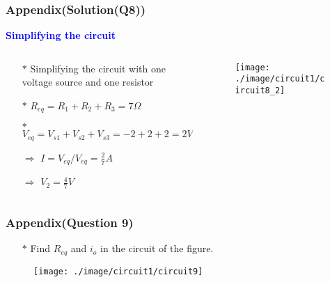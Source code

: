 \documentclass{beamer}
\newcommand{\blue}[1]{\textcolor{blue}{#1}}
\begin{document}
\begin{frame}
\frametitle{Appendix(Solution(Q8))}
\blue{{\bf Simplifying the circuit}}

\begin{columns}
\begin{column}{7cm}
\begin{itemize} \itemsep1pt \parskip0pt 
  \item[$\ast$] Simplifying the circuit with one voltage source and one resistor
  \item[$\ast$] $R_{eq} = R_1 + R_2 + R_3 = 7\Omega$
  \item[$\ast$] $V_{eq} = V_{s1} + V_{s2} + V_{s3} = -2 + 2 + 2 = 2V$
  \item[$\Rightarrow$] $I = V_{eq}/V_{eq} = \frac{2}{7}A$
  \item[$\Rightarrow$] $V_2 = \frac{4}{7}V$
\end{itemize}
\end{column}

\begin{column}{5cm}
\begin{figure}[H]
  \centering
  \texttt{[image: ./image/circuit1/circuit8\_2]}
\end{figure}
\end{column}



\end{columns}


\end{frame}

\begin{frame}
\frametitle{Appendix(Question 9)}
\begin{itemize} \itemsep1pt \parskip0pt 
  \item[$\ast$] Find $R_{eq}$ and $i_o$ in the circuit of the figure.
\end{itemize}

\begin{figure}[H]
  \centering
  \texttt{[image: ./image/circuit1/circuit9]}
\end{figure}


\end{frame}
\end{document}
